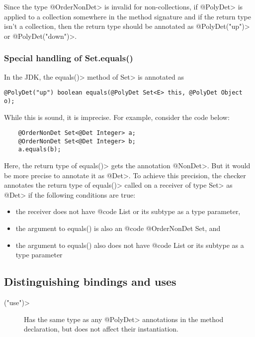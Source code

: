 Since the type \<@OrderNonDet> is invalid for non-collections,
if \<@PolyDet> is applied to a collection somewhere in the method signature
and if the return type isn't a collection, then the return type should be
annotated as \<@PolyDet("up")> or \<@PolyDet("down")>.

\subsubsection{Special handling of Set.equals()\label{determinism-improved-precision-set-equals}}

In the JDK, the \<equals()> method of \<Set> is annotated as
\begin{Verbatim}
@PolyDet("up") boolean equals(@PolyDet Set<E> this, @PolyDet Object o);
\end{Verbatim}
While this is sound, it is imprecise.
For example, consider the code below:

\begin{Verbatim}
    @OrderNonDet Set<@Det Integer> a;
    @OrderNonDet Set<@Det Integer> b;
    a.equals(b);
\end{Verbatim}

Here, the return type of \<equals()> gets the annotation \<@NonDet>.
But it would be more precise to annotate it as \<@Det>.
To achieve this precision, the checker annotates the return type
of \<equals()> called on a receiver of type \<Set> as \<@Det> if the
following conditions are true:
\begin{itemize}
    \item the receiver does not have {@code List} or its subtype as a type parameter,
    \item the argument to equals() is also an {@code @OrderNonDet Set}, and
    \item the argument to equals() also does not have {@code List} or its subtype as a
    type parameter
\end{itemize}

\subsection{Distinguishing bindings and uses\label{determinism-polymorphism-binding}}

\begin{description}
\item[\<("use")>]
  Has the same type as any \<@PolyDet> annotations in the method
  declaration, but does not affect their instantiation.
\end{description}

